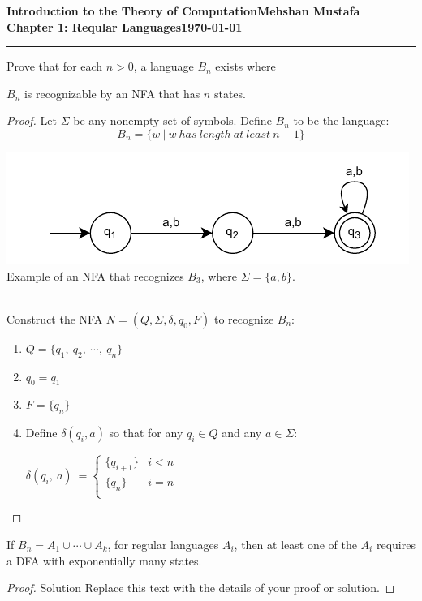\documentclass[11pt]{article}
\newcommand{\myname}{Mehshan Mustafa}
\newcommand{\dated}{\today}
\newenvironment{problem}[2][Problem]{\begin{trivlist}
\item[\hskip \labelsep {\bfseries #1}\hskip \labelsep {\bfseries #2.}]}{\end{trivlist}}
\begin{document}
\textbf{Introduction to the Theory of
Computation}\hfill\textbf{\myname}\\[0.01in]
\textbf{Chapter 1: Reqular Languages}\hfill\textbf{\dated}\\
\smallskip\hrule\bigskip

\begin{problem}{1.65}
Prove that for each $n > 0$, a language $B_{n}$ exists where
\end{problem}

\begin{problem}[Part]{a}
$B_{n}$ is recognizable by an NFA that has $n$ states.
\end{problem}

\begin{proof}
Let $\Sigma$ be any nonempty set of symbols. Define $B_{n}$ to be the language:
\[
B_{n} = \{w \ | \ w \ has \ length \ at \ least \ n-1 \}
\]
\begin{center}
\includegraphics[scale=1.0]{Figures/Problem1.65.pdf} \\
Example of an NFA that recognizes $B_{3}$, where $\Sigma = \{a, b\}$.
\end{center}
$ $ \\
Construct the NFA $N=(Q, \Sigma, \delta, q_{0}, F)$ to recognize $B_{n}$:
\begin{enumerate}
\item $Q = \{q_{1}, \ q_{2}, \ \cdots, \ q_{n}\}$
\item $q_{0} = q_{1}$
\item $F = \{q_{n}\}$
\item Define $\delta(q_{i}, a)$ so that for any $q_{i} \in Q$ and any $a \in \Sigma$:
\begin{center}
$\displaystyle \delta(q_{i},\ a) \ =\begin{cases}
\{q_{i+1}\} & i < n \\
\{q_{n}\} & i = n \\
\end{cases} \ \ $
\end{center}
\end{enumerate}
\end{proof}

\begin{problem}[Part]{b}
If $B_{n} = A_{1} \cup \cdots \cup A_{k}$, for regular languages $A_{i}$, then at least one of the $A_{i}$ requires a DFA with exponentially many states.
\end{problem}

\begin{proof}
Solution Replace this text with the details of your proof or solution.
\end{proof}
\end{document}
